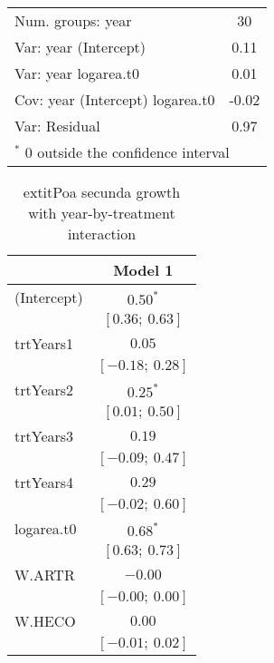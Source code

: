 \begin{table}
\begin{center}
\begin{tabular}{l c }
Num. groups: year                & 30                \\
Var: year (Intercept)            & 0.11              \\
Var: year logarea.t0             & 0.01              \\
Cov: year (Intercept) logarea.t0 & -0.02             \\
Var: Residual                    & 0.97              \\
\hline
\multicolumn{2}{l}{\scriptsize{$^*$ 0 outside the confidence interval}}
\end{tabular}
\label{table:POSEgrowth-inARTR}
\end{center}
\end{table}


\begin{table}
\caption{	extit{Poa secunda} growth with year-by-treatment interaction}
\begin{center}
\begin{tabular}{l c }
\hline
 & Model 1 \\
\hline
(Intercept)                      & $0.50^{*}$        \\
                                 & $[0.36;\ 0.63]$   \\
trtYears1                        & $0.05$            \\
                                 & $[-0.18;\ 0.28]$  \\
trtYears2                        & $0.25^{*}$        \\
                                 & $[0.01;\ 0.50]$   \\
trtYears3                        & $0.19$            \\
                                 & $[-0.09;\ 0.47]$  \\
trtYears4                        & $0.29$            \\
                                 & $[-0.02;\ 0.60]$  \\
logarea.t0                       & $0.68^{*}$        \\
                                 & $[0.63;\ 0.73]$   \\
W.ARTR                           & $-0.00$           \\
                                 & $[-0.00;\ 0.00]$  \\
W.HECO                           & $0.00$            \\
                                 & $[-0.01;\ 0.02]$  \\

\end{tabular}
\end{center}
\end{table}
